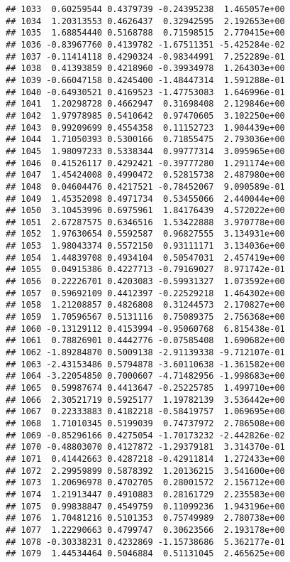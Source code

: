 \documentclass[
]{article}
\begin{document}
\begin{verbatim}
## 1033  0.60259544 0.4379739 -0.24395238  1.465057e+00
## 1034  1.20313553 0.4626437  0.32942595  2.192653e+00
## 1035  1.68854440 0.5168788  0.71598515  2.770415e+00
## 1036 -0.83967760 0.4139782 -1.67511351 -5.425284e-02
## 1037 -0.11414118 0.4290324 -0.98344991  7.252289e-01
## 1038  0.41393859 0.4218960 -0.39934978  1.264303e+00
## 1039 -0.66047158 0.4245400 -1.48447314  1.591288e-01
## 1040 -0.64930521 0.4169523 -1.47753083  1.646996e-01
## 1041  1.20298728 0.4662947  0.31698408  2.129846e+00
## 1042  1.97978985 0.5410642  0.97470605  3.102250e+00
## 1043  0.99209699 0.4554358  0.11152723  1.904439e+00
## 1044  1.71050393 0.5300166  0.71855475  2.793036e+00
## 1045  1.98097233 0.5338344  0.99777314  3.095965e+00
## 1046  0.41526117 0.4292421 -0.39777280  1.291174e+00
## 1047  1.45424008 0.4990472  0.52815738  2.487980e+00
## 1048  0.04604476 0.4217521 -0.78452067  9.090589e-01
## 1049  1.45352098 0.4971734  0.53455066  2.440044e+00
## 1050  3.10453996 0.6975961  1.84176439  4.572022e+00
## 1051  2.67287575 0.6346516  1.53422888  3.970778e+00
## 1052  1.97630654 0.5592587  0.96827555  3.134931e+00
## 1053  1.98043374 0.5572150  0.93111171  3.134036e+00
## 1054  1.44839708 0.4934104  0.50547031  2.457419e+00
## 1055  0.04915386 0.4227713 -0.79169027  8.971742e-01
## 1056  0.22226701 0.4203083 -0.59931327  1.073592e+00
## 1057  0.59692109 0.4412397 -0.22529218  1.464302e+00
## 1058  1.21208857 0.4826808  0.31244573  2.170827e+00
## 1059  1.70596567 0.5131116  0.75089375  2.756368e+00
## 1060 -0.13129112 0.4153994 -0.95060768  6.815438e-01
## 1061  0.78826901 0.4442776 -0.07585408  1.690682e+00
## 1062 -1.89284870 0.5009138 -2.91139338 -9.712107e-01
## 1063 -2.43153486 0.5794878 -3.60110638 -1.361582e+00
## 1064 -3.22054850 0.7000607 -4.71482956 -1.998683e+00
## 1065  0.59987674 0.4413647 -0.25225785  1.499710e+00
## 1066  2.30521719 0.5925177  1.19782139  3.536442e+00
## 1067  0.22333883 0.4182218 -0.58419757  1.069695e+00
## 1068  1.71010345 0.5199039  0.74737972  2.786508e+00
## 1069 -0.85296166 0.4275054 -1.70173232 -2.442826e-02
## 1070 -0.48803070 0.4127872 -1.29379181  3.314370e-01
## 1071  0.41442663 0.4287218 -0.42911814  1.272433e+00
## 1072  2.29959899 0.5878392  1.20136215  3.541600e+00
## 1073  1.20696978 0.4702705  0.28001572  2.156712e+00
## 1074  1.21913447 0.4910883  0.28161729  2.235583e+00
## 1075  0.99838847 0.4549759  0.11099236  1.943196e+00
## 1076  1.70481216 0.5101353  0.75749989  2.780738e+00
## 1077  1.22290663 0.4799747  0.30623566  2.193178e+00
## 1078 -0.30338231 0.4232869 -1.15738686  5.362177e-01
## 1079  1.44534464 0.5046884  0.51131045  2.465625e+00

\end{verbatim}
\end{document}
